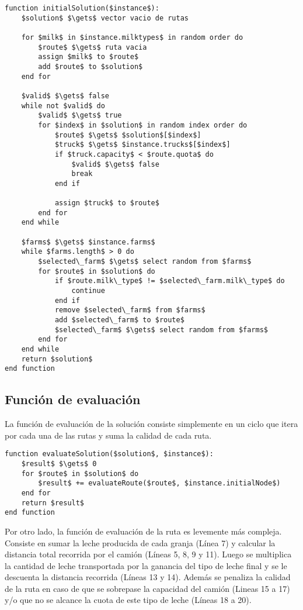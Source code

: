 \begin{lstlisting}[style=estiloPseudocodigo]
function initialSolution($instance$):
    $solution$ $\gets$ vector vacio de rutas

    for $milk$ in $instance.milktypes$ in random order do
        $route$ $\gets$ ruta vacia
        assign $milk$ to $route$
        add $route$ to $solution$
    end for

    $valid$ $\gets$ false
    while not $valid$ do
        $valid$ $\gets$ true
        for $index$ in $solution$ in random index order do
            $route$ $\gets$ $solution$[$index$]
            $truck$ $\gets$ $instance.trucks$[$index$]
            if $truck.capacity$ < $route.quota$ do
                $valid$ $\gets$ false
                break
            end if
            
            assign $truck$ to $route$
        end for
    end while

    $farms$ $\gets$ $instance.farms$
    while $farms.length$ > 0 do
        $selected\_farm$ $\gets$ select random from $farms$
        for $route$ in $solution$ do
            if $route.milk\_type$ != $selected\_farm.milk\_type$ do
                continue
            end if
            remove $selected\_farm$ from $farms$
            add $selected\_farm$ to $route$
            $selected\_farm$ $\gets$ select random from $farms$
        end for
    end while
    return $solution$
end function
\end{lstlisting}


\subsection{Función de evaluación}

La función de evaluación de la solución consiste simplemente en un ciclo que itera por cada una de las rutas y suma la calidad de cada ruta.

\begin{lstlisting}[style=estiloPseudocodigo]
function evaluateSolution($solution$, $instance$):
    $result$ $\gets$ 0
    for $route$ in $solution$ do
        $result$ += evaluateRoute($route$, $instance.initialNode$)
    end for
    return $result$
end function
\end{lstlisting}

Por otro lado, la función de evaluación de la ruta es levemente más compleja. Consiste en sumar la leche producida de cada granja (Línea 7) y calcular la distancia total recorrida por el camión (Líneas 5, 8, 9 y 11). Luego se multiplica la cantidad de leche transportada por la ganancia del tipo de leche final y se le descuenta la distancia recorrida (Líneas 13 y 14). Además se penaliza la calidad de la ruta en caso de que se sobrepase la capacidad del camión (Lineas 15 a 17) y/o que no se alcance la cuota de este tipo de leche (Líneas 18 a 20).

